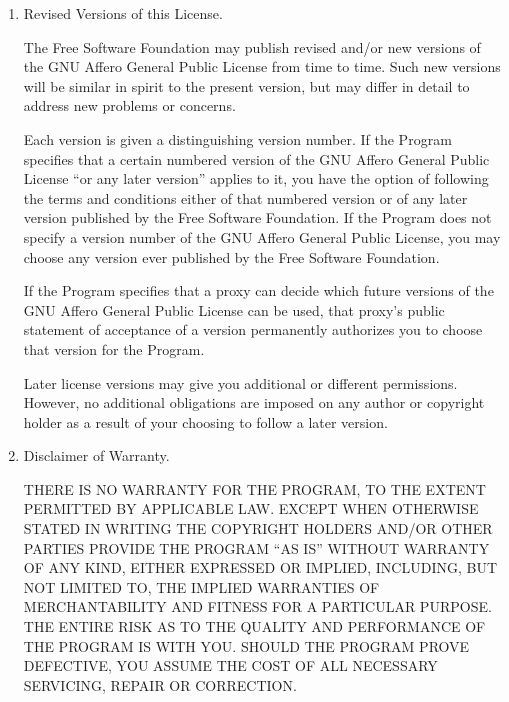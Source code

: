 \documentclass[10pt,a4paper,ngerman,titlepage,tocindentauto]{article}
\begin{document}
\begin{multicols}{3}
{\begin{enumerate}
						Notwithstanding any other provision of this License, you have permission to
						link or combine any covered work with a work licensed under version 3 of
						the GNU General Public License into a single combined work, and to convey
						the resulting work.  The terms of this License will continue to apply to
						the part which is the covered work, but the work with which it is combined
						will remain governed by version 3 of the GNU General Public License.

						\item Revised Versions of this License.

						The Free Software Foundation may publish revised and/or new versions of
						the GNU Affero General Public License from time to time.  Such new versions will
						be similar in spirit to the present version, but may differ in detail to
						address new problems or concerns.

						Each version is given a distinguishing version number.  If the
						Program specifies that a certain numbered version of the GNU Affero General
						Public License ``or any later version'' applies to it, you have the
						option of following the terms and conditions either of that numbered
						version or of any later version published by the Free Software
						Foundation.  If the Program does not specify a version number of the
						GNU Affero General Public License, you may choose any version ever published
						by the Free Software Foundation.

						If the Program specifies that a proxy can decide which future
						versions of the GNU Affero General Public License can be used, that proxy's
						public statement of acceptance of a version permanently authorizes you
						to choose that version for the Program.

						Later license versions may give you additional or different
						permissions.  However, no additional obligations are imposed on any
						author or copyright holder as a result of your choosing to follow a
						later version.

						\item Disclaimer of Warranty.

						\begin{sloppypar}
						 THERE IS NO WARRANTY FOR THE PROGRAM, TO THE EXTENT PERMITTED BY
						 APPLICABLE LAW.  EXCEPT WHEN OTHERWISE STATED IN WRITING THE
						 COPYRIGHT HOLDERS AND/OR OTHER PARTIES PROVIDE THE PROGRAM ``AS IS''
						 WITHOUT WARRANTY OF ANY KIND, EITHER EXPRESSED OR IMPLIED,
						 INCLUDING, BUT NOT LIMITED TO, THE IMPLIED WARRANTIES OF
						 MERCHANTABILITY AND FITNESS FOR A PARTICULAR PURPOSE.  THE ENTIRE
						 RISK AS TO THE QUALITY AND PERFORMANCE OF THE PROGRAM IS WITH YOU.
						 SHOULD THE PROGRAM PROVE DEFECTIVE, YOU ASSUME THE COST OF ALL
						 NECESSARY SERVICING, REPAIR OR CORRECTION.
						\end{sloppypar}


\end{enumerate}}
\end{multicols}
\end{document}
